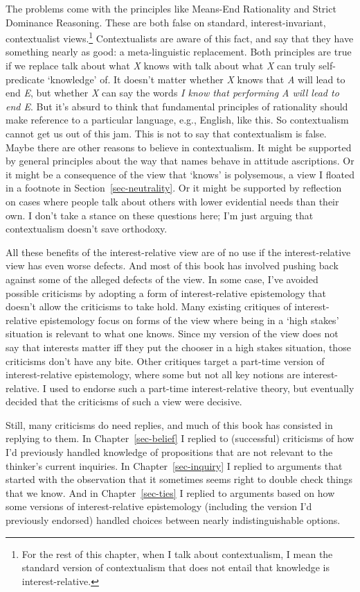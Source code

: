 \documentclass[
  10pt,
  letterpaper,
  twoside]{scrbook}
\begin{document}
The problems come with the principles like Means-End Rationality and
Strict Dominance Reasoning. These are both false on standard,
interest-invariant, contextualist views.\footnote{For the rest of this
  chapter, when I talk about contextualism, I mean the standard version
  of contextualism that does not entail that knowledge is
  interest-relative.} Contextualists are aware of this fact, and say
that they have something nearly as good: a meta-linguistic replacement.
Both principles are true if we replace talk about what \emph{X} knows
with talk about what \emph{X} can truly self-predicate `knowledge' of.
It doesn't matter whether \emph{X} knows that \emph{A} will lead to end
\emph{E}, but whether \emph{X} can say the words \emph{I know that
performing A will lead to end E}. But it's absurd to think that
fundamental principles of rationality should make reference to a
particular language, e.g., English, like this. So contextualism cannot
get us out of this jam. This is not to say that contextualism is false.
Maybe there are other reasons to believe in contextualism. It might be
supported by general principles about the way that names behave in
attitude ascriptions. Or it might be a consequence of the view that
`knows' is polysemous, a view I floated in a footnote in
Section~\ref{sec-neutrality}. Or it might be supported by reflection on
cases where people talk about others with lower evidential needs than
their own. I don't take a stance on these questions here; I'm just
arguing that contextualism doesn't save orthodoxy.

All these benefits of the interest-relative view are of no use if the
interest-relative view has even worse defects. And most of this book has
involved pushing back against some of the alleged defects of the view.
In some case, I've avoided possible criticisms by adopting a form of
interest-relative epistemology that doesn't allow the criticisms to take
hold. Many existing critiques of interest-relative epistemology focus on
forms of the view where being in a `high stakes' situation is relevant
to what one knows. Since my version of the view does not say that
interests matter iff they put the chooser in a high stakes situation,
those criticisms don't have any bite. Other critiques target a part-time
version of interest-relative epistemology, where some but not all key
notions are interest-relative. I used to endorse such a part-time
interest-relative theory, but eventually decided that the criticisms of
such a view were decisive.

Still, many criticisms do need replies, and much of this book has
consisted in replying to them. In Chapter~\ref{sec-belief} I replied to
(successful) criticisms of how I'd previously handled knowledge of
propositions that are not relevant to the thinker's current inquiries.
In Chapter~\ref{sec-inquiry} I replied to arguments that started with
the observation that it sometimes seems right to double check things
that we know. And in Chapter~\ref{sec-ties} I replied to arguments based
on how some versions of interest-relative epistemology (including the
version I'd previously endorsed) handled choices between nearly
indistinguishable options.
\end{document}
